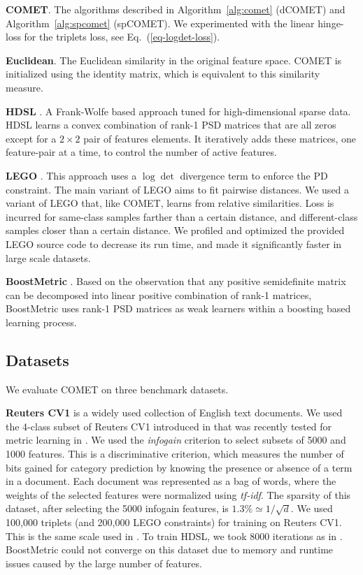 \documentclass[twoside,11pt]{article}
\renewcommand{\eqref}[1]{Eq.~(\ref{#1})}
\begin{document}
\textbf{COMET}. The algorithms described in Algorithm~\ref{alg:comet} (dCOMET) and Algorithm~\ref{alg:spcomet} (spCOMET). We experimented with the linear hinge-loss for the triplets loss, see \eqref{eq-logdet-loss}.

\textbf{Euclidean}. The Euclidean similarity in the original feature space. COMET is initialized using the identity matrix, which is equivalent to this similarity measure.

\textbf{HDSL} \citep{HDSL}. A Frank-Wolfe based approach tuned for high-dimensional sparse data. HDSL learns a convex combination of rank-1 PSD matrices that are all zeros except for a $2\times2$ pair of features elements. It iteratively adds these matrices, one feature-pair at a time, to control the number of active features.

\textbf{LEGO} \citep{lego}. This approach uses a $\log \det$ divergence term to enforce the PD constraint. The main variant of LEGO aims to fit pairwise distances. We used a variant of LEGO that, like COMET, learns from relative similarities. Loss is incurred for same-class samples farther than a certain distance, and different-class samples closer than a certain distance. We profiled and optimized the provided LEGO source code to decrease its run time, and made it significantly faster in large scale datasets.

\noindent\textbf{BoostMetric} \citep{boost}. Based on the observation that any positive semidefinite matrix can be decomposed into linear positive combination of rank-1 matrices, BoostMetric uses rank-1 PSD matrices as weak learners within a boosting based learning process.

\subsection{Datasets}
We evaluate COMET on three benchmark datasets.

\textbf{Reuters CV1} is a widely used collection of English text documents. We used the 4-class subset of Reuters CV1 introduced in \citep{CaiRCV14} that was recently tested for metric learning in \citep{HDSL}. We used the \textit{infogain} criterion \citep{infogain} to select subsets of 5000 and 1000 features. This is a discriminative criterion, which measures the number of bits gained for category prediction by knowing the presence or absence of a term in a document. Each document was represented as a bag of words, where the weights of the selected features were normalized using \textit{tf-idf}. The sparsity of this dataset, after selecting the 5000 infogain features, is $1.3\% \simeq 1/\sqrt{d}$. We used 100,000 triplets (and 200,000 LEGO constraints) for training on Reuters CV1. This is the same scale used in \citet{HDSL}. To train HDSL, we took 8000 iterations as in \citep{HDSL}. BoostMetric could not converge on this dataset due to memory and runtime issues caused by the large number of features.
\end{document}

